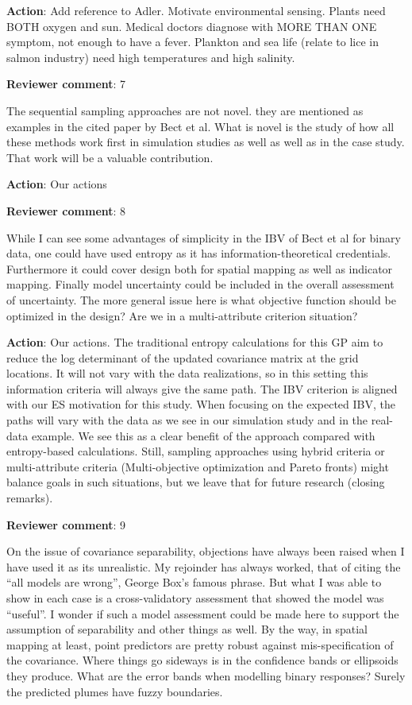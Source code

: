 \documentclass[a4paper]{article}
\def\revcom{\textbf{Reviewer comment}}
\def\action{\textbf{Action}}
\begin{document}
\begin{answers}
\action: Add reference to Adler. Motivate environmental sensing. Plants need BOTH oxygen and sun. Medical doctors diagnose with MORE THAN ONE symptom, not enough to have a fever. Plankton and sea life (relate to lice in salmon industry) need high temperatures and high salinity. 

\item{\revcom: 7}\label{r1c7}

 The sequential sampling approaches are not novel. they are mentioned as examples in the cited paper by Bect et al. What is novel is the study of how all these methods work first in simulation studies as well as well as in the case study. That work will be a valuable contribution.

\action: Our actions

\item{\revcom:  8}\label{r1c8}

While I can see some advantages of simplicity in the IBV of Bect et al for binary data, one could have used entropy as it has information-theoretical credentials. Furthermore it could cover design both for spatial mapping as well as indicator mapping. Finally model uncertainty could be included in the overall assessment of uncertainty. The more general issue here is what objective function should be optimized in the design? Are we in a multi-attribute criterion situation?

\action: Our actions. The traditional entropy calculations for this GP aim to reduce the log determinant of the updated covariance matrix at the grid locations. It will not vary with the data realizations, so in this setting this information criteria will always give the same path. The IBV criterion is aligned with our ES motivation for this study. When focusing on the expected IBV, the paths will vary with the data as we see in our simulation study and in the real-data example. We see this as a clear benefit of the approach compared with entropy-based calculations. Still, sampling approaches using hybrid criteria or multi-attribute criteria (Multi-objective optimization and Pareto fronts) might balance goals in such situations, but we leave that for future research (closing remarks). 

\item{\revcom:  9}\label{r1c9}

On the issue of covariance separability, objections have always been raised when I have used it as its unrealistic. My rejoinder has always worked, that of citing the “all models are wrong”, George Box’s famous phrase. But what I was able to show in each case is a cross-validatory assessment that showed the model was “useful”. I wonder if such a model assessment could be made here to support the assumption of separability and other things as well. By the way, in spatial mapping at least, point predictors are pretty robust against mis-specification of the covariance. Where things go sideways is in the confidence bands or ellipsoids they produce. What are the error bands when modelling binary responses? Surely the predicted plumes have fuzzy boundaries. 


\end{answers}
\end{document}
